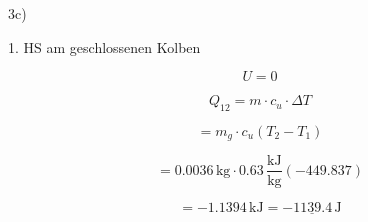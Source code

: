 3c)

1. HS am geschlossenen Kolben

\[
U = 0
\]

\[
Q_{12} = m \cdot c_{u} \cdot \Delta T
\]

\[
= m_{g} \cdot c_{u} (T_{2} - T_{1})
\]

\[
= 0.0036 \, \text{kg} \cdot 0.63 \, \frac{\text{kJ}}{\text{kg}} (-449.837)
\]

\[
= -1.1394 \, \text{kJ} = \underline{-1139.4 \, \text{J}}
\]